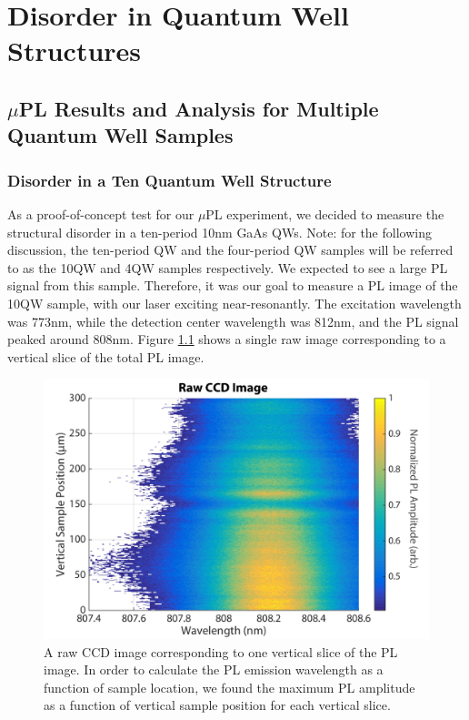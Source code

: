 \chapter{Disorder in Quantum Well Structures}

\section{$\mu$PL Results and Analysis for Multiple Quantum Well Samples}
\subsection{Disorder in a Ten Quantum Well Structure}
\indent As a proof-of-concept test for our $\mu$PL experiment, we decided to measure the structural disorder in a ten-period 10nm GaAs QWs. Note: for the following discussion, the ten-period QW and the four-period QW samples will be referred to as the 10QW and 4QW samples respectively. We expected to see a large PL signal from this sample. Therefore, it was our goal to measure a PL image of the 10QW sample, with our laser exciting near-resonantly. The excitation wavelength was 773nm, while the detection center wavelength was 812nm, and the PL signal peaked around 808nm. Figure \ref{raw10qw} shows a single raw image corresponding to a vertical slice of the total PL image. 
\begin{figure}[h!]
\centering
\includegraphics[width = .8\textwidth]{RAWCCDIMG.png}
\caption{ \doublespacing A raw CCD image corresponding to one vertical slice of the PL image. In order to calculate the PL emission wavelength as a function of sample location, we found the maximum PL amplitude as a function of vertical sample position for each vertical slice.}
\label{raw10qw}
\end{figure}


